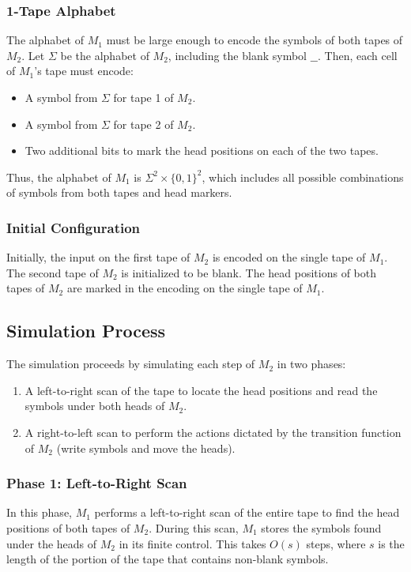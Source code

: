 \documentclass[a4paper]{article}
\begin{document}
\subsubsection{1-Tape Alphabet}
The alphabet of \( M_1 \) must be large enough to encode the symbols of both tapes of \( M_2 \). Let \( \Sigma \) be the alphabet of \( M_2 \), including the blank symbol \( \_\_ \). Then, each cell of \( M_1 \)'s tape must encode:
\begin{itemize}
    \item A symbol from \( \Sigma \) for tape 1 of \( M_2 \).
    \item A symbol from \( \Sigma \) for tape 2 of \( M_2 \).
    \item Two additional bits to mark the head positions on each of the two tapes.
\end{itemize}
Thus, the alphabet of \( M_1 \) is \( \Sigma^2 \times \{0, 1\}^2 \), which includes all possible combinations of symbols from both tapes and head markers.

\subsubsection{Initial Configuration}
Initially, the input on the first tape of \( M_2 \) is encoded on the single tape of \( M_1 \). The second tape of \( M_2 \) is initialized to be blank. The head positions of both tapes of \( M_2 \) are marked in the encoding on the single tape of \( M_1 \).

\subsection{Simulation Process}

The simulation proceeds by simulating each step of \( M_2 \) in two phases:
\begin{enumerate}
    \item A left-to-right scan of the tape to locate the head positions and read the symbols under both heads of \( M_2 \).
    \item A right-to-left scan to perform the actions dictated by the transition function of \( M_2 \) (write symbols and move the heads).
\end{enumerate}

\subsubsection{Phase 1: Left-to-Right Scan}
In this phase, \( M_1 \) performs a left-to-right scan of the entire tape to find the head positions of both tapes of \( M_2 \). During this scan, \( M_1 \) stores the symbols found under the heads of \( M_2 \) in its finite control. This takes \( O(s) \) steps, where \( s \) is the length of the portion of the tape that contains non-blank symbols.
\end{document}
